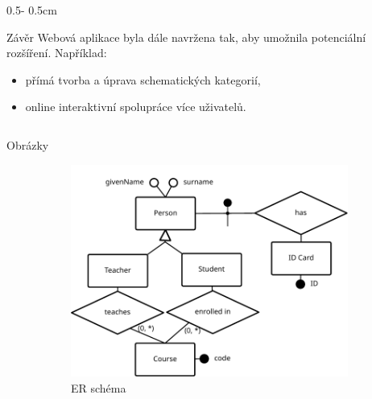 \documentclass[a0paper]{uioposter}
\begin{document}
\begin{frame}
\begin{columns}[onlytextwidth]
\begin{column}{0.5\textwidth - 0.5cm}
\begin{block}{Závěr}
        Webová aplikace byla dále navržena tak, aby umožnila potenciální rozšíření.
        Například:
        \begin{itemize}
          \item přímá tvorba a úprava schematických kategorií,
          \item online interaktivní spolupráce více uživatelů.
        \end{itemize}
      \end{block}
    \end{column}
  \end{columns}
  \vskip1cm
  \begin{block}{Obrázky}
      \vskip-1cm
    \begin{figure}
      \centering
      \begin{subfigure}{0.3396\textwidth}
        \includegraphics[width=\textwidth]{./images/university-er.pdf}
        \caption*{ER schéma}
      \end{subfigure}
      \hspace{3cm}
      \begin{subfigure}{0.2604\textwidth}

\end{subfigure}
\end{figure}
\end{block}
\end{frame}
\end{document}
